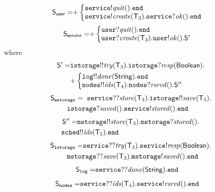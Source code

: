 \begin{align*}
\ST_\mathsf{user} = &
{+}
\left\{
\begin{array}{@{}l@{}}
\mathtt{service}{!}\mathit{quit}().\tend\\
\mathtt{service}{!}\mathit{create}(\T_3).\mathtt{service}{?}\mathit{ok}().\tend\\
\end{array} \right.
\end{align*}
\begin{align*}
	\ST_\mathsf{service} = &
	{+}
	\left\{
	\begin{array}{@{}l@{}}
	\mathtt{user}{?}\mathit{quit}().\tend \\
	\mathtt{user}{?}\mathit{create}(\T_3).\mathtt{user}{!}\mathit{ok}().\ST'\\
	\end{array} \right.
\end{align*}
where
\begin{align*}
	\ST' = &
	\mathtt{istorage}{!!}\mathit{try}(\T_3).\mathtt{istorage}{?}\mathit{resp}(\mathsf{Boolean}).\\
	&
	{+}
	\left\{
	\begin{array}{@{}l@{}}
	\mathtt{log}{!!}\mathit{done}(\mathsf{String}).\tend\\
	\mathtt{nodes}{!!}\mathit{ids}(\T_4).\mathtt{nodes}{?}\mathit{rsrvd}().\ST''\\
	\end{array} \right.
\end{align*}
\begin{align*}
	\ST_\mathtt{mstorage} =  & \hspace{2mm}
	\mathtt{service}{??}\mathit{store}(\T_3).\mathtt{istorage}{!!}\mathit{save}(\T_3).\\ & \hspace{-8mm}
	\mathtt{istorage}{?}\mathit{saved}().\mathtt{service}{!}\mathit{stored}().\tend
\end{align*}
\begin{align*}
	\ST'' = & 
	\mathtt{mstorage}{!!}\mathit{store}(\T_3).\mathtt{mstorage}{?}\mathit{stored}().\\ & \hspace{-8mm}
	\mathtt{sched}{!!}\mathit{ids}(\T_5).\tend
\end{align*}
\begin{align*}
	\ST_\mathtt{istorage} =  &
	\mathtt{service}{??}\mathit{try}(\T_3).\mathtt{service}{!}\mathit{resp}(\mathsf{Boolean}).\\ & \hspace{-8mm}
	\mathtt{mstorage}{??}\mathit{save}(\T_3).\mathtt{mstorage}{!}\mathit{saved}().\tend
\end{align*}
\begin{align*}
	{\mathsf S}_\mathtt{log} =  &
	\mathtt{service}{??}\mathit{done}(\mathsf{String}).\mathtt{end}
\end{align*}
\begin{align*}
	{\mathsf S}_\mathtt{nodes} =  &
	\mathtt{service}{??}\mathit{ids}({\mathsf T}_4).\mathtt{service}{!}\mathit{rsrvd}().\mathtt{end}
\end{align*}

